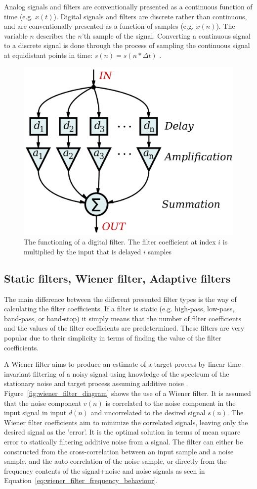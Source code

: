 Analog signals and filters are conventionally presented as a continuous function of time (e.g. $x(t)$). Digital signals and filters are discrete rather than continuous, and are conventionally presented as a function of samples (e.g. $x(n)$). The variable $n$ describes the $n$'th sample of the signal. Converting a continuous signal to a discrete signal is done through the process of sampling the continuous signal at equidistant points in time: $s(n)=s(n*\Delta t)$ \cite{linear_systems_and_signals}.

\begin{figure}[h!t]
	\begin{center}
		\includegraphics[width=0.4\columnwidth]{images/wikipedia_fir_digital_filter.png}
	\end{center}
	\caption{The functioning of a digital filter. The filter coefficient at index $i$ is multiplied by the input that is delayed $i$ samples \cite{wikipedia:digital_fir_filter_image}}
	\label{fig:wiki_digital_filter_working}
\end{figure}

\subsection{Static filters, Wiener filter, Adaptive filters}\label{sec:filters_theory}
The main difference between the different presented filter types is the way of calculating the filter coefficients. If a filter is static (e.g. high-pass, low-pass, band-pass, or band-stop) it simply means that the number of filter coefficients and the values of the filter coefficients are predetermined. These filters are very popular due to their simplicity in terms of finding the value of the filter coefficients. 

A Wiener filter aims to produce an estimate of a target process by linear time-invariant filtering of a noisy signal using knowledge of the spectrum of the stationary noise and target process assuming additive noise \cite{wiki:Wiener_filter,lecture_adaptive_filters_1}. Figure~\ref{fig:wiener_filter_diagram} shows the use of a Wiener filter. It is assumed that the noise component $v(n)$ is correlated to the noise component in the input signal in input $d(n)$ and uncorrelated to the desired signal $s(n)$. The Wiener filter coefficients aim to minimize the correlated signals, leaving only the desired signal as the 'error'. It is the optimal solution in terms of mean square error to statically filtering additive noise from a signal. The filter can either be constructed from the cross-correlation between an input sample and a noise sample, and the auto-correlation of the noise sample, or directly from the frequency contents of the signal+noise and noise signals as seen in Equation~\ref{eq:wiener_filter_frequency_behaviour}.

